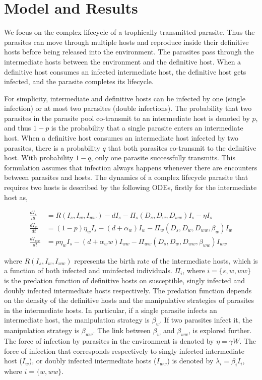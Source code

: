\documentclass[11pt]{article}
\begin{document}
\section*{Model and Results}

We focus on the complex lifecycle of a trophically transmitted parasite. 
Thus the parasites can move through multiple hosts and reproduce inside their definitive hosts before being released into the environment. 
The parasites pass through the intermediate hosts between the environment and the definitive host.
When a definitive host consumes an infected intermediate host, the definitive host gets infected, and the parasite completes its lifecycle.

For simplicity, intermediate and definitive hosts can be infected by one (single infection) or at most two parasites (double infections). 
The probability that two parasites in the parasite pool co-transmit to an intermediate host is denoted by  $p$, and thus $1-p$ is the probability that a single parasite enters an intermediate host. 
When a definitive host consumes an intermediate host infected by two parasites, there is a probability $q$ that both parasites co-transmit to the definitive host.
With probability $1-q$, only one parasite successfully transmits. 
This formulation assumes that infection always happens whenever there are encounters between parasites and hosts.
The dynamics of a complex lifecycle parasite that requires two hosts is described by the following ODEs, firstly for the intermediate host as,

\begin{align}
\frac{dI_s}{dt} &= R(I_s, I_w, I_{ww}) - d I_s - \Pi_s(D_s, D_w, D_{ww}) I_s  - \eta  I_s \nonumber \\ 
\frac{dI_w}{dt} &=  (1 - p) \eta_w I_s  - (d + \alpha_w) I_w - \Pi_w(D_s, D_w, D_{ww}, \beta_w) I_w \label{odes:ihosts} \\
\frac{dI_{ww}}{dt} &= p \eta_w I_s  - (d + \alpha_ww) I_{ww} - \Pi_{ww}(D_s, D_w, D_{ww}, \beta_{ww}) I_{ww} \nonumber
\end{align}

where $R(I_s, I_w, I_{ww})$ represents the birth rate of the intermediate hosts, which is a function of both infected and uninfected individuals.
$\Pi_i$, where $i = \{s, w, ww\}$ is the predation function of definitive hosts on susceptible, singly infected and doubly infected intermediate hosts respectively. 
The predation function depends on the density of the definitive hosts and the manipulative strategies of parasites in the intermediate hosts. 
In particular, if a single parasite infects an intermediate host, the manipulation strategy is $\beta_w$. 
If two parasites infect it, the manipulation strategy is $\beta_{ww}$. 
The link between $\beta_w$ and $\beta_{ww}$, is explored further. 
The force of infection by parasites in the environment is denoted by $\eta = \gamma W$. 
The force of infection that corresponds respectively to singly infected intermediate host ($I_w$), or doubly infected intermediate hosts ($I_{ww}$) is denoted by $\lambda_i = \beta_i I_i$, where $i = \{ w, ww\}$. 
\end{document}

